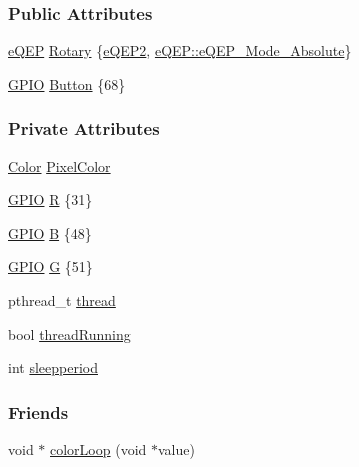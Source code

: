 \subsubsection*{Public Attributes}
\begin{DoxyCompactItemize}
\item 
\hyperlink{class_hardware_1_1e_q_e_p}{e\+Q\+E\+P} \hyperlink{class_hardware_1_1_e_c12_p_abfe8d6ea8948c77d4866ca8a05dbebe9}{Rotary} \{\hyperlink{eqep_8h_a2dfbafc696aef9c14226ce25fb77c5f1}{e\+Q\+E\+P2}, \hyperlink{class_hardware_1_1e_q_e_p_a3f97f26c64d49d6f2643a257b7249070a5e916ce9f21af5bd9c5c63609630df7e}{e\+Q\+E\+P\+::e\+Q\+E\+P\+\_\+\+Mode\+\_\+\+Absolute}\}
\item 
\hyperlink{class_hardware_1_1_g_p_i_o}{G\+P\+I\+O} \hyperlink{class_hardware_1_1_e_c12_p_a6d91a7b1767f080af8c33bacdae1dd1d}{Button} \{68\}
\end{DoxyCompactItemize}
\subsubsection*{Private Attributes}
\begin{DoxyCompactItemize}
\item 
\hyperlink{class_hardware_1_1_e_c12_p_a8341f410cd939bf03160fe239bc782aa}{Color} \hyperlink{class_hardware_1_1_e_c12_p_a1bc6223c152c6d9f30304b92069f05c0}{Pixel\+Color}
\item 
\hyperlink{class_hardware_1_1_g_p_i_o}{G\+P\+I\+O} \hyperlink{class_hardware_1_1_e_c12_p_a0a4f03a37d709349994e800e44f5c781}{R} \{31\}
\item 
\hyperlink{class_hardware_1_1_g_p_i_o}{G\+P\+I\+O} \hyperlink{class_hardware_1_1_e_c12_p_a326f00b2047ecb58ee1e7e894dc61ad3}{B} \{48\}
\item 
\hyperlink{class_hardware_1_1_g_p_i_o}{G\+P\+I\+O} \hyperlink{class_hardware_1_1_e_c12_p_a7afd63c14e12d861c8b20614ef34d70e}{G} \{51\}
\item 
pthread\+\_\+t \hyperlink{class_hardware_1_1_e_c12_p_a718a90836ff46cd71d18ce099a656533}{thread}
\item 
bool \hyperlink{class_hardware_1_1_e_c12_p_a81af8167f5a5192d8575ebad04952d57}{thread\+Running}
\item 
int \hyperlink{class_hardware_1_1_e_c12_p_adff7ed51fd97bac61075c88a06102348}{sleepperiod}
\end{DoxyCompactItemize}
\subsubsection*{Friends}
\begin{DoxyCompactItemize}
\item 
void $\ast$ \hyperlink{class_hardware_1_1_e_c12_p_ae57007919c8fb89fc45e952de846c90e}{color\+Loop} (void $\ast$value)
\end{DoxyCompactItemize}


